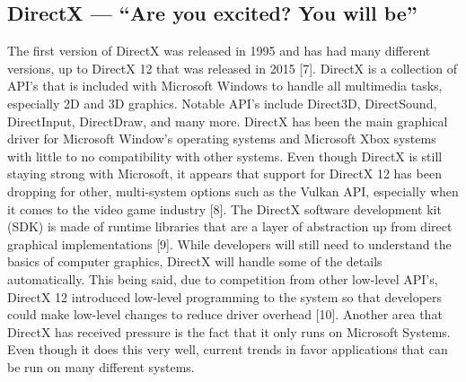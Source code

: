 \documentclass[onecolumn, draftclsnofoot,10pt, compsoc]{IEEEtran}
\begin{document}
\subsection{DirectX –-- ``Are you excited? You will be''}
The first version of DirectX was released in 1995 and has had many different versions, up to DirectX 12 that was released in 2015 [7]. DirectX is a collection of API's that is included with Microsoft Windows to handle all multimedia tasks, especially 2D and 3D graphics. Notable API's include Direct3D, DirectSound, DirectInput, DirectDraw, and many more. DirectX has been the main graphical driver for Microsoft Window's operating systems and Microsoft Xbox systems with little to no compatibility with other systems. Even though DirectX is still staying strong with Microsoft, it appears that support for DirectX 12 has been dropping for other, multi-system options such as the Vulkan API, especially when it comes to the video game industry [8].
\newline
\newline
The DirectX software development kit (SDK) is made of runtime libraries that are a layer of abstraction up from direct graphical implementations [9]. While developers will still need to understand the basics of computer graphics, DirectX will handle some of the details automatically. This being said, due to competition from other low-level API's, DirectX 12 introduced low-level programming to the system so that developers could make low-level changes to reduce driver overhead [10]. Another area that DirectX has received pressure is the fact that it only runs on Microsoft Systems. Even though it does this very well, current trends in favor applications that can be run on many different systems. 
\end{document}
